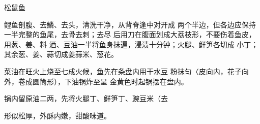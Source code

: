\begin{recipe}{松鼠鱼}

\ingredients


\cooking

\step 	鲤鱼剖腹、去鱗、去头，清洗干净，从背脊逢中对开成 两个半边，但各边应保持一半完整的鱼尾，去骨去刺；去尽 后用刀在腹面划成大荔枝形，不要伤着鱼皮，用葱、姜、料 酒、豆油一半将鱼身抹遍，浸渍十分钟；火腿、鲜笋各切成 小丁；其余葱、姜、蒜切成姜蒜米、葱花。

\step 	菜油在旺火上烧至七成火候，鱼先在条盘内用干水豆 粉抹匀〈皮向内，花子向外，卷成圆筒形），下油锅炸至呈 金黄色时起锅摆在盘内。

\step 	锅内留原油二两，先将火腿丁、鲜笋丁、豌豆米（去

\notes

形似松厚，外酥内嫩，甜酸味道。

\end{recipe}

